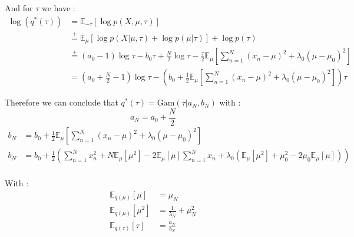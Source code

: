 \documentclass{article}
\begin{document}
And for $\tau$ we have :
\begin{equation}
    \begin{split}
        \log(q^*(\tau)) & = \mathbb{E}_{-\tau}[\log p(X, \mu, \tau)]                                                                                                                           \\
                        & \overset{+}{=} \mathbb{E}_\mu[\log p(X|\mu, \tau) + \log p(\mu|\tau)] + \log p(\tau)                                                                                 \\
                        & \overset{+}{=} (a_0 - 1)\log \tau - b_0\tau + \frac{N}{2}\log \tau - \frac{\tau}{2}\mathbb{E}_\mu\left[\sum_{n=1}^{N}(x_n - \mu)^2 + \lambda_0(\mu - \mu_0)^2\right] \\
                        & = (a_0 + \frac{N}{2} - 1)\log \tau - \left(b_0 + \frac{1}{2}\mathbb{E}_\mu\left[\sum_{n=1}^{N}(x_n - \mu)^2 + \lambda_0(\mu - \mu_0)^2\right]\right)\tau
    \end{split}
\end{equation}

Therefore we can conclude that $q^*(\tau) = \text{Gam}(\tau|a_N, b_N)$ with :
\begin{equation}
    a_N = a_0 + \frac{N}{2}
\end{equation}
\begin{equation}
    \begin{split}
        b_N & = b_0 + \frac{1}{2}\mathbb{E}_\mu\left[\sum_{n=1}^{N}(x_n - \mu)^2 + \lambda_0(\mu - \mu_0)^2\right]                                                                                                     \\
        b_N & = b_0 + \frac{1}{2}\left(\sum_{n=1}^{N}x_n^2 + N\mathbb{E}_\mu[\mu^2] - 2\mathbb{E}_\mu[\mu]\sum_{n=1}^{N}x_n + \lambda_0\left(\mathbb{E}_\mu[\mu^2] + \mu_0^2 - 2\mu_0\mathbb{E}_\mu[\mu]\right)\right) \\
    \end{split}
\end{equation}

With :
\begin{equation}
    \begin{split}
        \mathbb{E}_{q(\mu)}[\mu]   & = \mu_N                         \\
        \mathbb{E}_{q(\mu)}[\mu^2] & = \frac{1}{\lambda_N} + \mu_N^2 \\
        \mathbb{E}_{q(\tau)}[\tau] & = \frac{a_N}{b_N}
    \end{split}
\end{equation}
\end{document}
